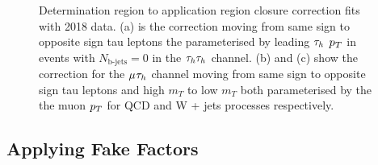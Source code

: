 \begin{figure}[!hbtp]
\centering
\caption{Determination region to application region closure correction fits with 2018 data. (a) is the correction moving from same sign to opposite sign tau leptons the parameterised by leading $\tau_{h}$ $p_{T}$ in events with $N_{\text{b-jets}}=0$ in the $\tau_{h}\tau_{h}$ channel. (b) and (c) show the correction for the $\mu_{}\tau_{h}$ channel moving from same sign to opposite sign tau leptons and high $m_{T}$ to low $m_{T}$ both parameterised by the the muon $p_{T}$ for QCD and W + jets processes respectively.}
\label{fig:ff_dr_to_ar}
\end{figure}


\subsection{Applying Fake Factors}
\label{sec:ff_applying}

